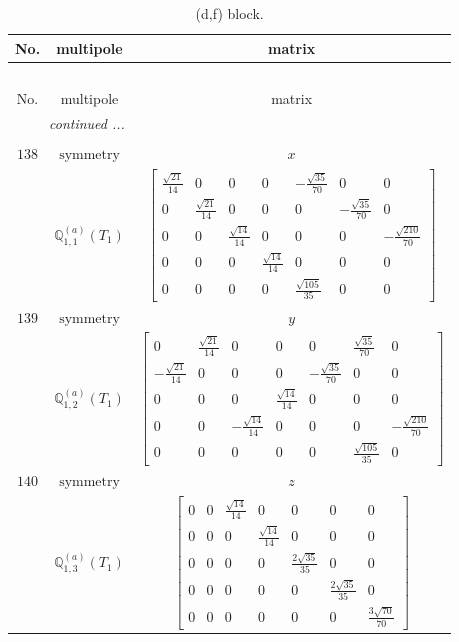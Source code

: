 \documentclass[fleqn,8pt,landscape]{jsarticle}
\begin{document}
\begin{longtable}{ccc}
\caption{(d,f) block.}
 \\
 \hline \hline
No. & multipole & matrix \\ \hline \endfirsthead

\multicolumn{2}{l}{\tablename\ \thetable{}} \\
 \hline \hline
No. & multipole & matrix \\ \hline \endhead

 \hline \hline
\multicolumn{2}{r}{\footnotesize\it continued ...} \\ \endfoot

 \hline \hline
\multicolumn{2}{r}{} \\ \endlastfoot

$ 138 $ & $ \text{symmetry} $ & $ x $ \\
$  $ & $ \mathbb{Q}_{1,1}^{(a)}(T_{1}) $ & $ \begin{bmatrix} \frac{\sqrt{21}}{14} & 0 & 0 & 0 & - \frac{\sqrt{35}}{70} & 0 & 0 \\ 0 & \frac{\sqrt{21}}{14} & 0 & 0 & 0 & - \frac{\sqrt{35}}{70} & 0 \\ 0 & 0 & \frac{\sqrt{14}}{14} & 0 & 0 & 0 & - \frac{\sqrt{210}}{70} \\ 0 & 0 & 0 & \frac{\sqrt{14}}{14} & 0 & 0 & 0 \\ 0 & 0 & 0 & 0 & \frac{\sqrt{105}}{35} & 0 & 0 \end{bmatrix} $ \\ \hline
$ 139 $ & $ \text{symmetry} $ & $ y $ \\
$  $ & $ \mathbb{Q}_{1,2}^{(a)}(T_{1}) $ & $ \begin{bmatrix} 0 & \frac{\sqrt{21}}{14} & 0 & 0 & 0 & \frac{\sqrt{35}}{70} & 0 \\ - \frac{\sqrt{21}}{14} & 0 & 0 & 0 & - \frac{\sqrt{35}}{70} & 0 & 0 \\ 0 & 0 & 0 & \frac{\sqrt{14}}{14} & 0 & 0 & 0 \\ 0 & 0 & - \frac{\sqrt{14}}{14} & 0 & 0 & 0 & - \frac{\sqrt{210}}{70} \\ 0 & 0 & 0 & 0 & 0 & \frac{\sqrt{105}}{35} & 0 \end{bmatrix} $ \\ \hline
$ 140 $ & $ \text{symmetry} $ & $ z $ \\
$  $ & $ \mathbb{Q}_{1,3}^{(a)}(T_{1}) $ & $ \begin{bmatrix} 0 & 0 & \frac{\sqrt{14}}{14} & 0 & 0 & 0 & 0 \\ 0 & 0 & 0 & \frac{\sqrt{14}}{14} & 0 & 0 & 0 \\ 0 & 0 & 0 & 0 & \frac{2 \sqrt{35}}{35} & 0 & 0 \\ 0 & 0 & 0 & 0 & 0 & \frac{2 \sqrt{35}}{35} & 0 \\ 0 & 0 & 0 & 0 & 0 & 0 & \frac{3 \sqrt{70}}{70} \end{bmatrix} $ \\ \hline

\end{longtable}
\end{document}
